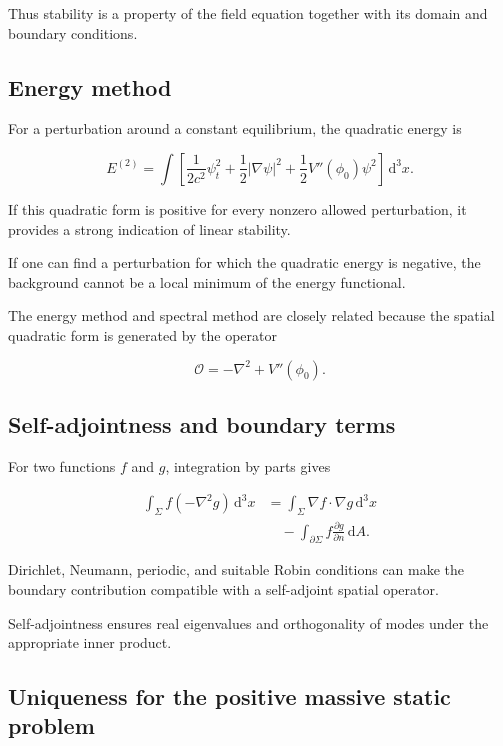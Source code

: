 Thus stability is a property of the field equation together with its domain and boundary conditions.

\subsection{Energy method}

For a perturbation around a constant equilibrium, the quadratic energy is

\[
E^{(2)}
=
\int
\left[
\frac{1}{2c^{2}}\psi_{t}^{2}
+
\frac{1}{2}|\nabla\psi|^{2}
+
\frac{1}{2}
V''(\phi_{0})\psi^{2}
\right]
\,\mathrm{d}^{3}x.
\]

If this quadratic form is positive for every nonzero allowed perturbation, it provides a strong indication of linear stability.

If one can find a perturbation for which the quadratic energy is negative, the background cannot be a local minimum of the energy functional.

The energy method and spectral method are closely related because the spatial quadratic form is generated by the operator

\[
\mathcal{O}
=
-\nabla^{2}+V''(\phi_{0}).
\]

\subsection{Self-adjointness and boundary terms}

For two functions \(f\) and \(g\), integration by parts gives

\[
\begin{aligned}
\int_{\Sigma}
f(-\nabla^{2}g)
\,\mathrm{d}^{3}x
&=
\int_{\Sigma}
\nabla f\cdot\nabla g
\,\mathrm{d}^{3}x\\
&\quad-
\int_{\partial\Sigma}
f
\frac{\partial g}{\partial n}
\,\mathrm{d}A.
\end{aligned}
\]

Dirichlet, Neumann, periodic, and suitable Robin conditions can make the boundary contribution compatible with a self-adjoint spatial operator.

Self-adjointness ensures real eigenvalues and orthogonality of modes under the appropriate inner product.

\subsection{Uniqueness for the positive massive static problem}

